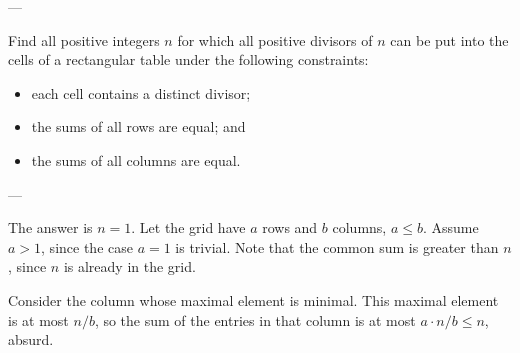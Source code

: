 
---

Find all positive integers $n$ for which all positive divisors of $n$ can be put into the cells of a rectangular table under the following constraints:
\begin{itemize}[itemsep=0em]
    \item each cell contains a distinct divisor;
    \item the sums of all rows are equal; and
    \item the sums of all columns are equal.
\end{itemize}

---

The answer is $n=1$. Let the grid have $a$ rows and $b$ columns, $a\le b$. Assume $a>1$, since the case $a=1$ is trivial. Note that the common sum is greater than $n$, since $n$ is already in the grid.

Consider the column whose maximal element is minimal. This maximal element is at most $n/b$, so the sum of the entries in that column is at most $a\cdot n/b\le n$, absurd.

